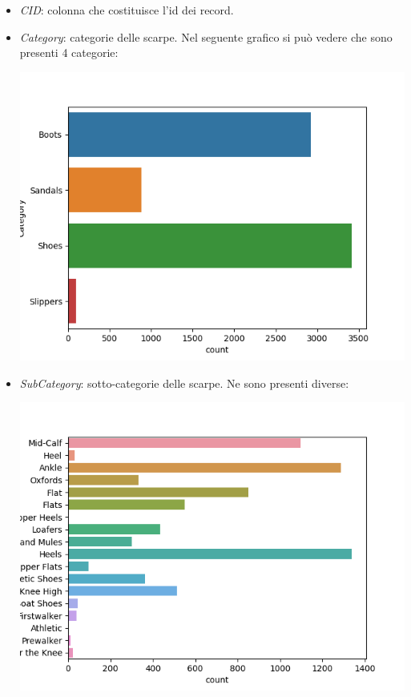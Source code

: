 \documentclass[a4paper, 11pt, oneside]{report}
\begin{document}
                \begin{itemize}
                    \item \textit{CID}: colonna che costituisce l'id dei record.
                    \item \textit{Category}: categorie delle scarpe.
                    Nel seguente grafico si può vedere che sono presenti 4 categorie:
                    \begin{center}
                        \includegraphics[scale=0.4]{CategoryShoes}
                    \end{center}
                    \item \textit{SubCategory}: sotto-categorie delle scarpe.
                    Ne sono presenti diverse:
                    \begin{center}
                        \includegraphics[scale=0.2]{SubCategoryShoes}

\end{center}
\end{itemize}
\end{document}

